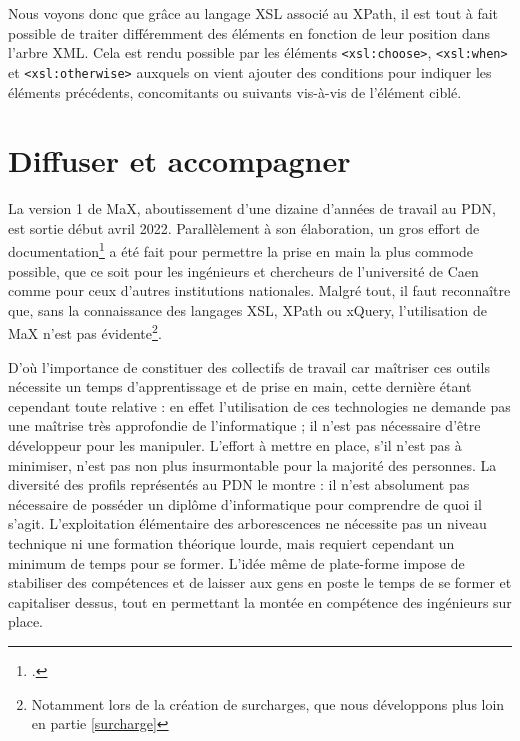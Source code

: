 \documentclass[a4paper,12pt,twoside]{book}
\begin{document}
    Nous voyons donc que grâce au langage \acrshort{XSL} associé au XPath, il est tout à fait possible de traiter différemment des éléments en fonction de leur position dans l'arbre XML. Cela est rendu possible par les éléments \texttt{<xsl:choose>}, \texttt{<xsl:when>} et \texttt{<xsl:otherwise>} auxquels on vient ajouter des conditions pour indiquer les éléments précédents, concomitants ou suivants vis-à-vis de l'élément ciblé.
    
    
\section{Diffuser et accompagner}
    La version 1 de MaX, aboutissement d'une dizaine d'années de travail au \acrshort{PDN}, est sortie début avril 2022. Parallèlement à son élaboration, un gros effort de documentation\footcite{maxdoc} a été fait pour permettre la prise en main la plus commode possible, que ce soit pour les ingénieurs et chercheurs de l'université de Caen comme pour ceux d'autres institutions nationales. Malgré tout, il faut reconnaître que, sans la connaissance des langages \acrshort{XSL}, XPath ou xQuery, l'utilisation de MaX n'est pas évidente\footnote{Notamment lors de la création de surcharges, que nous développons plus loin en partie \ref{surcharge}}.
    
   D’où l’importance de constituer des collectifs de travail car maîtriser ces outils nécessite un temps d'apprentissage et de prise en main, cette dernière étant cependant toute relative : en effet l'utilisation de ces technologies ne demande pas une maîtrise très approfondie de l'informatique ; il n'est pas nécessaire d'être développeur pour les manipuler. L'effort à mettre en place, s'il n'est pas à minimiser, n'est pas non plus insurmontable pour la majorité des personnes. La diversité des profils représentés au \acrshort{PDN} le montre : il n'est absolument pas nécessaire de posséder un diplôme d'informatique pour comprendre de quoi il s'agit. L'exploitation élémentaire des arborescences ne nécessite pas un niveau technique ni une formation théorique lourde, mais requiert cependant un minimum de temps pour se former. L'idée même de plate-forme impose de stabiliser des compétences et de laisser aux gens en poste le temps de se former et capitaliser dessus, tout en permettant la montée en compétence des ingénieurs sur place.
    
\end{document}
